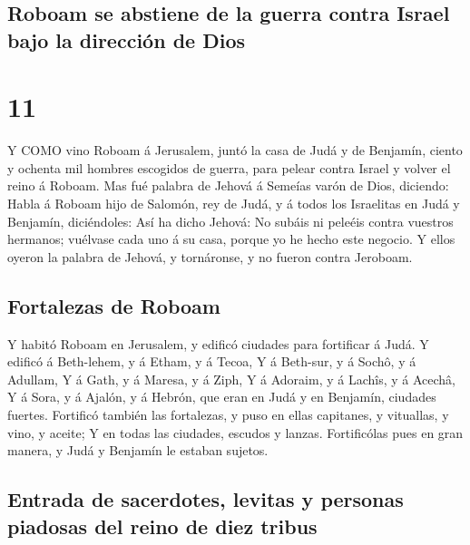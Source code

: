 \hypertarget{roboam-se-abstiene-de-la-guerra-contra-israel-bajo-la-direcciuxf3n-de-dios}{%
\subsection{Roboam se abstiene de la guerra contra Israel bajo la
dirección de
Dios}\label{roboam-se-abstiene-de-la-guerra-contra-israel-bajo-la-direcciuxf3n-de-dios}}

\hypertarget{section-10}{%
\section{11}\label{section-10}}

 Y COMO vino Roboam á Jerusalem, juntó la casa de Judá y de
Benjamín, ciento y ochenta mil hombres escogidos de guerra, para pelear
contra Israel y volver el reino á Roboam.  Mas fué palabra
de Jehová á Semeías varón de Dios, diciendo:  Habla á Roboam
hijo de Salomón, rey de Judá, y á todos los Israelitas en Judá y
Benjamín, diciéndoles:  Así ha dicho Jehová: No subáis ni
peleéis contra vuestros hermanos; vuélvase cada uno á su casa, porque yo
he hecho este negocio. Y ellos oyeron la palabra de Jehová, y
tornáronse, y no fueron contra Jeroboam.

\hypertarget{fortalezas-de-roboam}{%
\subsection{Fortalezas de Roboam}\label{fortalezas-de-roboam}}

 Y habitó Roboam en Jerusalem, y edificó ciudades para
fortificar á Judá.  Y edificó á Beth-lehem, y á Etham, y á
Tecoa,  Y á Beth-sur, y á Sochô, y á Adullam,  Y
á Gath, y á Maresa, y á Ziph,  Y á Adoraim, y á Lachîs, y á
Acechâ,  Y á Sora, y á Ajalón, y á Hebrón, que eran en Judá
y en Benjamín, ciudades fuertes.  Fortificó también las
fortalezas, y puso en ellas capitanes, y vituallas, y vino, y aceite;
 Y en todas las ciudades, escudos y lanzas. Fortificólas
pues en gran manera, y Judá y Benjamín le estaban sujetos.

\hypertarget{entrada-de-sacerdotes-levitas-y-personas-piadosas-del-reino-de-diez-tribus}{%
\subsection{Entrada de sacerdotes, levitas y personas piadosas del reino
de diez
tribus}\label{entrada-de-sacerdotes-levitas-y-personas-piadosas-del-reino-de-diez-tribus}}

